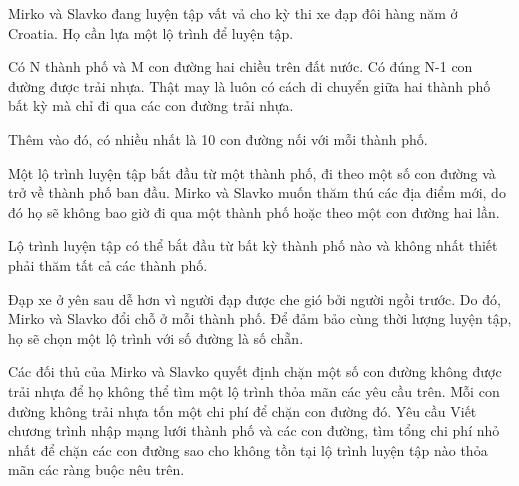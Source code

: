 Mirko và Slavko đang luyện tập vất vả cho kỳ thi xe đạp đôi hàng năm ở Croatia. Họ cần lựa một lộ trình để luyện tập.  

   Có N thành phố và M con đường hai chiều trên đất nước. Có đúng N-1 con đường được trải nhựa. Thật may là luôn có cách di chuyển giữa hai thành phố bất kỳ mà chỉ đi qua các con đường trải nhựa.  

   Thêm vào đó, có nhiều nhất là 10 con đường nối với mỗi thành phố.  

   Một lộ trình luyện tập bắt đầu từ một thành phố, đi theo một số con đường và trở về thành phố ban đầu. Mirko và Slavko muốn thăm thú các địa điểm mới, do đó họ sẽ không bao giờ đi qua một thành phố hoặc theo một con đường hai lần.  

   Lộ trình luyện tập có thể bắt đầu từ bất kỳ thành phố nào và không nhất thiết phải thăm tất cả các thành phố.  

   Đạp xe ở yên sau dễ hơn vì người đạp được che gió bởi người ngồi trước. Do đó, Mirko và Slavko đổi chỗ ở mỗi thành phố. Để đảm bảo cùng thời lượng luyện tập, họ sẽ chọn một lộ trình với số đường là số chẵn.  

   Các đối thủ của Mirko và Slavko quyết định chặn một số con đường không được trải nhựa để họ không thể tìm một lộ trình thỏa mãn các yêu cầu trên. Mỗi con đường không trải nhựa tốn một chi phí để chặn con đường đó.
Yêu cầu
Viết chương trình nhập mạng lưới thành phố và các con đường, tìm tổng chi phí nhỏ nhất để chặn các con đường sao cho không tồn tại lộ trình luyện tập nào thỏa mãn các ràng buộc nêu trên.
